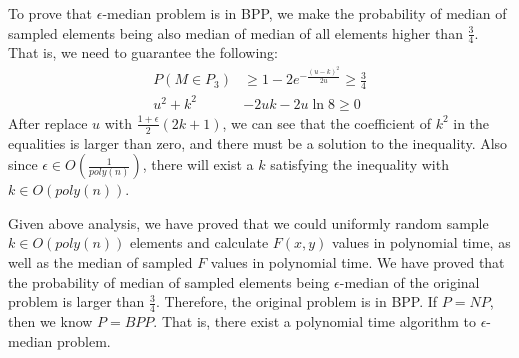 \documentclass[paper=a4, fontsize=11pt]{scrartcl} %
\numberwithin{equation}{section} %
\numberwithin{figure}{section} %
\numberwithin{table}{section} %
\begin{document}
To prove that $\epsilon$-median problem is in BPP, we make the probability of median of sampled
elements being also median of median of all elements higher than $\frac{3}{4}$. That is, we need to
guarantee the following:
\begin{align}
   P(M \in P_3) &\geq 1 - 2 e^{-\frac{(u-k)^2}{2u}} \geq \frac{3}{4} \\
   u^2 + k^2 & -2uk -2u\ln 8 \geq 0  
\end{align}
After replace $u$ with $\frac{1 + \epsilon}{2} (2k+1)$, we can see that the coefficient of $k^2$ in 
the equalities is larger than zero, and there must be a solution to the inequality. Also since
$\epsilon \in O(\frac{1}{poly(n)})$, there will exist a $k$ satisfying the inequality with $k \in
O(poly(n))$.

Given above analysis, we have proved that we could uniformly random sample $k \in O(poly(n))$
elements and calculate $F(x, y)$ values in polynomial time, as well as the median of sampled $F$
values in polynomial time. We have proved that the probability of median of sampled elements 
being $\epsilon$-median of the original problem is larger than $\frac{3}{4}$. Therefore, the
original problem is in BPP. If $P = NP$, then we know $P = BPP$. That is, there exist a polynomial
time algorithm to $\epsilon$-median problem.
\end{document}
